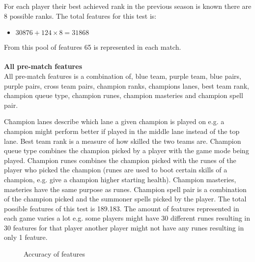 For each player their best achieved rank in the previous season is known there are 8 possible ranks. The total features for this test is: 
\begin{itemize}
\item $30876 + 124\times8 = 31868$
\end{itemize}
From this pool of features 65 is represented in each match. \\\\
\textbf{All pre-match features}\\
All pre-match features is a combination of, blue team, purple team, blue pairs, purple pairs, cross team pairs, champion ranks, champions lanes, best team rank, champion queue type, champion runes, champion masteries and champion spell pair.  

Champion lanes describe which lane a given champion is played on e.g. a champion might perform better if played in the middle lane instead of the top lane. Best team rank is a measure of how skilled the two teams are. Champion queue type combines the champion picked by a player with the game mode being played. Champion runes combines the champion picked with the runes of the player who picked the champion (runes are used to boot certain skills of a champion, e.g. give a champion higher starting health). Champion masteries, masteries have the same purpose as runes. Champion spell pair is a combination of the champion picked and the summoner spells picked by the player. The total possible features of this test is 189.183. The amount of features represented in each game varies a lot e.g. some players might have 30 different runes resulting in 30 features for that player another player might not have any runes resulting in only 1 feature.
\begin{figure}[!htb]
  \centering
   \caption{Accuracy of features}\label{fig:cluster-feat}
\end{figure}

